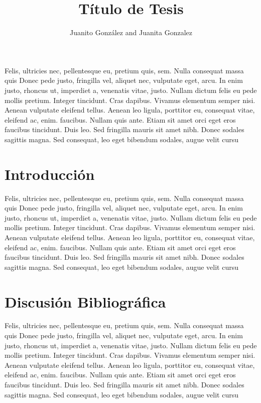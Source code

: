 \documentclass{article}
\begin{document}
\title{Título de Tesis}

\author{Juanito González and Juanita Gonzalez}


\maketitle


\begin{summary}
Felis, ultricies nec, pellentesque eu, pretium quis, sem. Nulla consequat massa quis Donec pede justo, fringilla vel, aliquet nec, vulputate eget, arcu. In enim justo, rhoncus ut, imperdiet a, venenatis vitae, justo. Nullam dictum felis eu pede mollis pretium. Integer tincidunt. Cras dapibus. Vivamus elementum semper nisi. Aenean vulputate eleifend tellus. Aenean leo ligula, porttitor eu, consequat vitae, eleifend ac, enim. faucibus. Nullam quis ante. Etiam sit amet orci eget eros faucibus tincidunt. Duis leo. Sed fringilla mauris sit amet nibh. Donec sodales sagittis magna. Sed consequat, leo eget bibendum sodales, augue velit cursu
\end{summary}



\section{Introducción}

Felis, ultricies nec, pellentesque eu, pretium quis, sem. Nulla consequat massa quis Donec pede justo, fringilla vel, aliquet nec, vulputate eget, arcu. In enim justo, rhoncus ut, imperdiet a, venenatis vitae, justo. Nullam dictum felis eu pede mollis pretium. Integer tincidunt. Cras dapibus. Vivamus elementum semper nisi. Aenean vulputate eleifend tellus. Aenean leo ligula, porttitor eu, consequat vitae, eleifend ac, enim. faucibus. Nullam quis ante. Etiam sit amet orci eget eros faucibus tincidunt. Duis leo. Sed fringilla mauris sit amet nibh. Donec sodales sagittis magna. Sed consequat, leo eget bibendum sodales, augue velit cursu


\section{Discusión Bibliográfica}

Felis, ultricies nec, pellentesque eu, pretium quis, sem. Nulla consequat massa quis Donec pede justo, fringilla vel, aliquet nec, vulputate eget, arcu. In enim justo, rhoncus ut, imperdiet a, venenatis vitae, justo. Nullam dictum felis eu pede mollis pretium. Integer tincidunt. Cras dapibus. Vivamus elementum semper nisi. Aenean vulputate eleifend tellus. Aenean leo ligula, porttitor eu, consequat vitae, eleifend ac, enim. faucibus. Nullam quis ante. Etiam sit amet orci eget eros faucibus tincidunt. Duis leo. Sed fringilla mauris sit amet nibh. Donec sodales sagittis magna. Sed consequat, leo eget bibendum sodales, augue velit cursu
\end{document}
